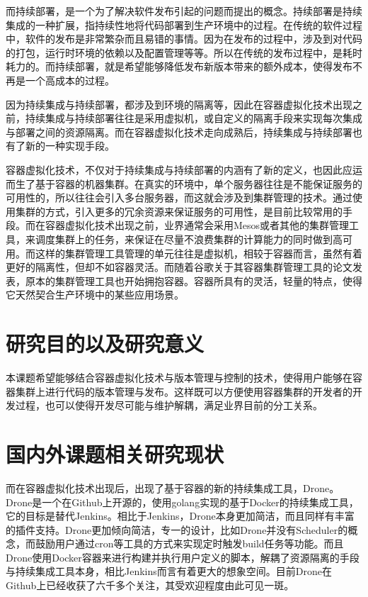 而持续部署，是一个为了解决软件发布引起的问题而提出的概念。持续部署是持续集成的一种扩展，指持续性地将代码部署到生产环境中的过程。在传统的软件过程中，软件的发布是非常繁杂而且易错的事情。因为在发布的过程中，涉及到对代码的打包，运行时环境的依赖以及配置管理等等。所以在传统的发布过程中，是耗时耗力的。而持续部署，就是希望能够降低发布新版本带来的额外成本，使得发布不再是一个高成本的过程。\supercite{CruiseControls}

因为持续集成与持续部署，都涉及到环境的隔离等，因此在容器虚拟化技术出现之前，持续集成与持续部署往往是采用虚拟机，或自定义的隔离手段来实现每次集成与部署之间的资源隔离。而在容器虚拟化技术走向成熟后，持续集成与持续部署也有了新的一种实现手段。

容器虚拟化技术，不仅对于持续集成与持续部署的内涵有了新的定义，也因此应运而生了基于容器的机器集群。在真实的环境中，单个服务器往往是不能保证服务的可用性的，所以往往会引入多台服务器，而这就会涉及到集群管理的技术。通过使用集群的方式，引入更多的冗余资源来保证服务的可用性，是目前比较常用的手段。而在容器虚拟化技术出现之前，业界通常会采用Mesos或者其他的集群管理工具，来调度集群上的任务，来保证在尽量不浪费集群的计算能力的同时做到高可用。而这样的集群管理工具管理的单元往往是虚拟机，相较于容器而言，虽然有着更好的隔离性，但却不如容器灵活。而随着谷歌关于其容器集群管理工具的论文发表\supercite{Borg}，原本的集群管理工具也开始拥抱容器。容器所具有的灵活，轻量的特点，使得它天然契合生产环境中的某些应用场景。

\section{研究目的以及研究意义}

本课题希望能够结合容器虚拟化技术与版本管理与控制的技术，使得用户能够在容器集群上进行代码的版本管理与发布。这样既可以方便使用容器集群的开发者的开发过程，也可以使得开发尽可能与维护解耦，满足业界目前的分工关系。

\section{国内外课题相关研究现状}

而在容器虚拟化技术出现后，出现了基于容器的新的持续集成工具，Drone。Drone是一个在Github上开源的，使用golang实现的基于Docker的持续集成工具，它的目标是替代Jenkins。相比于Jenkins，Drone本身更加简洁，而且同样有丰富的插件支持。Drone更加倾向简洁，专一的设计，比如Drone并没有Scheduler的概念，而鼓励用户通过cron等工具的方式来实现定时触发build任务等功能。而且Drone使用Docker容器来进行构建并执行用户定义的脚本，解耦了资源隔离的手段与持续集成工具本身，相比Jenkins而言有着更大的想象空间。目前Drone在Github上已经收获了六千多个关注，其受欢迎程度由此可见一斑。


